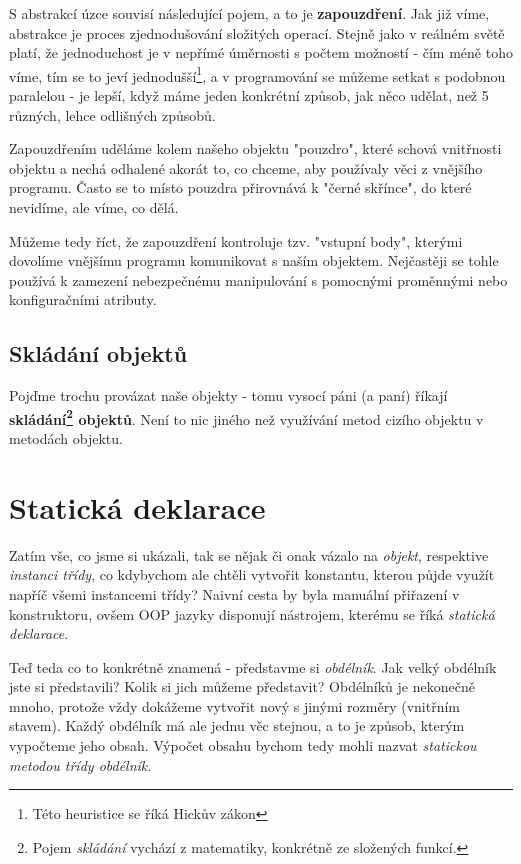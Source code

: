 S abstrakcí úzce souvisí následující pojem, a to je \textbf{zapouzdření}. Jak již víme, abstrakce je proces zjednodušování složitých operací. Stejně jako v reálném světě platí, že jednoduchost je v nepřímé úměrnosti s počtem možností - čím méně toho víme, tím se to jeví jednodušší\footnote{Této heuristice se říká Hickův zákon}, a v programování se můžeme setkat s podobnou paralelou - je lepší, když máme jeden konkrétní způsob, jak něco udělat, než 5 různých, lehce odlišných způsobů.

Zapouzdřením uděláme kolem našeho objektu "pouzdro", které schová vnitřnosti objektu a nechá odhalené akorát to, co chceme, aby používaly věci z vnějšího programu. Často se to místo pouzdra přirovnává k "černé skřínce", do které nevidíme, ale víme, co dělá.

Můžeme tedy říct, že zapouzdření kontroluje tzv. "vstupní body", kterými dovolíme vnějšímu programu komunikovat s naším objektem. Nejčastěji se tohle používá k zamezení nebezpečnému manipulování s pomocnými proměnnými nebo konfiguračními atributy.

\subsection{Skládání objektů}
Pojďme trochu provázat naše objekty - tomu vysocí páni (a paní) říkají \textbf{skládání\footnote{Pojem \textit{skládání} vychází z matematiky, konkrétně ze složených funkcí.} objektů}. Není to nic jiného než využívání metod cizího objektu v metodách objektu.

\section{Statická deklarace}
Zatím vše, co jsme si ukázali, tak se nějak či onak vázalo na \textit{objekt}, respektive \textit{instanci třídy}, co kdybychom ale chtěli vytvořit konstantu, kterou půjde využít napříč všemi instancemi třídy? Naivní cesta by byla manuální přiřazení v konstruktoru, ovšem OOP jazyky disponují nástrojem, kterému se říká \textit{statická deklarace}.

Teď teda co to konkrétně znamená - představme si \textit{obdélník}. Jak velký obdélník jste si představili? Kolik si jich můžeme představit? Obdélníků je nekonečně mnoho, protože vždy dokážeme vytvořit nový s jinými rozměry (vnitřním stavem). Každý obdélník má ale jednu věc stejnou, a to je způsob, kterým vypočteme jeho obsah. Výpočet obsahu bychom tedy mohli nazvat \textit{statickou metodou třídy obdélník}.

